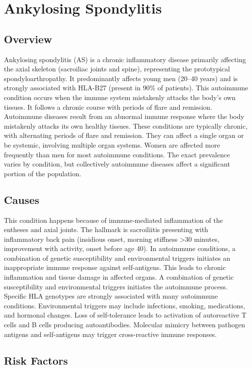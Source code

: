\chapter{Ankylosing Spondylitis}
\label{sec:Ankylosing Spondylitis}

\section{Overview}
Ankylosing spondylitis (AS) is a chronic inflammatory disease primarily affecting the axial skeleton (sacroiliac joints and spine), representing the prototypical spondyloarthropathy. It predominantly affects young men (20--40 years) and is strongly associated with HLA-B27 (present in 90\% of patients). This autoimmune condition occurs when the immune system mistakenly attacks the body's own tissues. It follows a chronic course with periods of flare and remission. Autoimmune diseases result from an abnormal immune response where the body mistakenly attacks its own healthy tissues. These conditions are typically chronic, with alternating periods of flare and remission. They can affect a single organ or be systemic, involving multiple organ systems. Women are affected more frequently than men for most autoimmune conditions. The exact prevalence varies by condition, but collectively autoimmune diseases affect a significant portion of the population.
\section{Causes}
This condition happens because of immune-mediated inflammation of the entheses and axial joints. The hallmark is sacroiliitis presenting with inflammatory back pain (insidious onset, morning stiffness >30 minutes, improvement with activity, onset before age 40). In autoimmune conditions, a combination of genetic susceptibility and environmental triggers initiates an inappropriate immune response against self-antigens. This leads to chronic inflammation and tissue damage in affected organs. A combination of genetic susceptibility and environmental triggers initiates the autoimmune process. Specific HLA genotypes are strongly associated with many autoimmune conditions. Environmental triggers may include infections, smoking, medications, and hormonal changes. Loss of self-tolerance leads to activation of autoreactive T cells and B cells producing autoantibodies. Molecular mimicry between pathogen antigens and self-antigens may trigger cross-reactive immune responses.
\section{Risk Factors}

